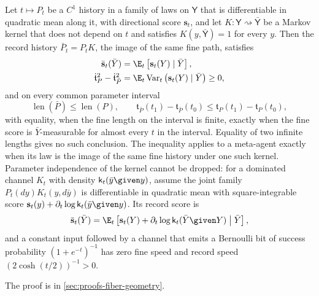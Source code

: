 Let $t\mapsto P_t$ be a $C^1$ history in a family of laws on $\mathsf Y$ that is
differentiable in quadratic mean along it, with directional score $\mathbf s_t$, and let
$K:\mathsf Y\rightsquigarrow\bar{\mathsf Y}$ be a Markov kernel that does not depend on
$t$ and satisfies $K(y,\bar{\mathsf Y})=1$ for every $y$.  Then the record history
$\bar P_t=P_tK$, the image of the same fine path, satisfies
\begin{align}
\bar{\mathbf s}_t(\bar Y)
&=\E_t\left[\mathbf s_t(Y)\mid\bar Y\right],
\label{eq:hist-record-score-projection}\\
\dot{\mathfrak t}_{P}^2-\dot{\mathfrak t}_{\bar P}^2
&=\E_t\operatorname{Var}_t\left(\mathbf s_t(Y)\mid\bar Y\right)
\geq0,
\label{eq:hist-record-conditional-variance-defect}
\end{align}
and on every common parameter interval
\begin{equation}
\operatorname{len}(\bar P)\leq\operatorname{len}(P),
\qquad
\mathfrak t_{\bar P}(t_1)-\mathfrak t_{\bar P}(t_0)
\leq
\mathfrak t_{P}(t_1)-\mathfrak t_{P}(t_0),
\label{eq:hist-record-clock-contraction}
\end{equation}
with equality, when the fine length on the interval is finite, exactly when the fine
score is $\bar Y$-measurable for almost every $t$ in the interval. Equality of two
infinite lengths gives no such conclusion. The inequality applies to a meta-agent exactly when its law is the image
of the same fine history under one such kernel.  Parameter independence of the kernel
cannot be dropped: for a dominated channel $K_t$ with density
$\mathsf k_t(\bar y\given y)$, assume the joint family $P_t(dy)K_t(y,d\bar y)$ is
differentiable in quadratic mean with square-integrable score
$\mathbf s_t(y)+\partial_t\log\mathsf k_t(\bar y\given y)$. Its record score is
\begin{equation}
\bar{\mathbf s}_t(\bar Y)
=\E_t\left[
\mathbf s_t(Y)
+\partial_t\log\mathsf k_t(\bar Y\given Y)
\mathrel{\big|}\bar Y
\right],
\label{eq:hist-parameter-dependent-channel-score}
\end{equation}
and a constant input followed by a channel that emits a Bernoulli bit of success
probability $(1+e^{-t})^{-1}$ has zero fine speed and record speed
$(2\cosh(t/2))^{-1}>0$.  

The proof is in \cref{sec:proofs-fiber-geometry}.

